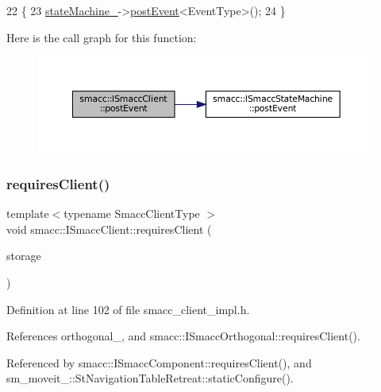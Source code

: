 \begin{DoxyCode}
22     \{
23         \hyperlink{classsmacc_1_1ISmaccClient_a926e4f2ae796def63d48dca389a48c47}{stateMachine\_}->\hyperlink{classsmacc_1_1ISmaccStateMachine_ad80cdd7bbc9a9f3b221c625754fed1ed}{postEvent}<EventType>();
24     \}
\end{DoxyCode}
Here is the call graph for this function\+:
\nopagebreak
\begin{figure}[H]
\begin{center}
\leavevmode
\includegraphics[width=350pt]{classsmacc_1_1ISmaccClient_a21a79203cb44fc717d4d977c190327c6_cgraph}
\end{center}
\end{figure}
\mbox{\label{classsmacc_1_1ISmaccClient_a7a9990a2f3e35d547671188d69fee520}} 
\subsubsection{\texorpdfstring{requires\+Client()}{requiresClient()}}
{\footnotesize\ttfamily template$<$typename Smacc\+Client\+Type $>$ \\
void smacc\+::\+I\+Smacc\+Client\+::requires\+Client (\begin{DoxyParamCaption}\item[{Smacc\+Client\+Type $\ast$\&}]{storage }\end{DoxyParamCaption})}



Definition at line 102 of file smacc\+\_\+client\+\_\+impl.\+h.



References orthogonal\+\_\+, and smacc\+::\+I\+Smacc\+Orthogonal\+::requires\+Client().



Referenced by smacc\+::\+I\+Smacc\+Component\+::requires\+Client(), and sm\+\_\+moveit\+\_\+::\+St\+Navigation\+Table\+Retreat\+::static\+Configure().


